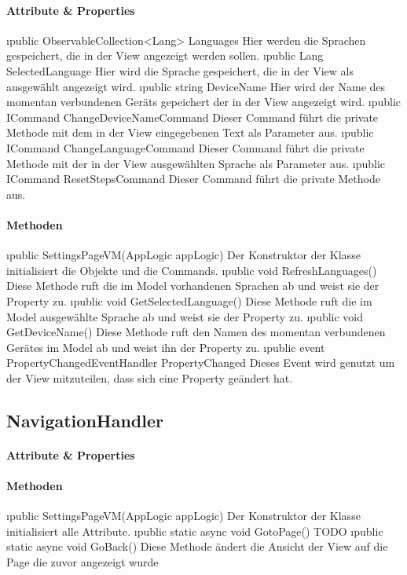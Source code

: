 \documentclass[../entwurf.tex]{subfiles}
\begin{document}
\paragraph{Attribute \& Properties}
\begin{itemize} 
	\i{public ObservableCollection<Lang> Languages} Hier werden die Sprachen gespeichert, die in der View angezeigt werden sollen.
	\i{public Lang SelectedLanguage} Hier wird die Sprache gespeichert, die in der View als ausgewählt angezeigt wird.
	\i{public string DeviceName} Hier wird der Name des momentan verbundenen Geräts gepeichert der in der View angezeigt wird.
	\i{public ICommand ChangeDeviceNameCommand} Dieser Command führt die private Methode  mit dem in der View eingegebenen Text als Parameter aus. 
	\i{public ICommand ChangeLanguageCommand} Dieser Command führt die private Methode  mit der in der View ausgewählten Sprache als Parameter aus. 
	\i{public ICommand ResetStepsCommand} Dieser Command führt die private Methode  aus. 
\end{itemize}
\paragraph{Methoden}
\begin{itemize}
	\i{public SettingsPageVM(AppLogic appLogic)} Der Konstruktor der Klasse initialisiert die Objekte  und die Commands.
	\i{public void RefreshLanguages()} Diese Methode ruft die im Model vorhandenen Sprachen ab und weist sie der Property  zu.
	\i{public void GetSelectedLanguage()} Diese Methode ruft die im Model ausgewählte Sprache ab und weist sie der Property  zu.
	\i{public void GetDeviceName()} Diese Methode ruft den Namen des momentan verbundenen Gerätes im Model ab und weist ihn der Property  zu.
	\i{public event PropertyChangedEventHandler PropertyChanged} Dieses Event wird genutzt um der View mitzuteilen, dass sich eine Property geändert hat.
\end{itemize}
\subsection{NavigationHandler}
\paragraph{Attribute \& Properties}
\paragraph{Methoden}
\begin{itemize}
	\i{public SettingsPageVM(AppLogic appLogic)} Der Konstruktor der Klasse initialisiert alle Attribute.
	\i{public static async void GotoPage()} TODO
	\i{public static async void GoBack()} Diese Methode ändert die Ansicht der View auf die Page die zuvor angezeigt wurde
\end{itemize}
\end{document}
